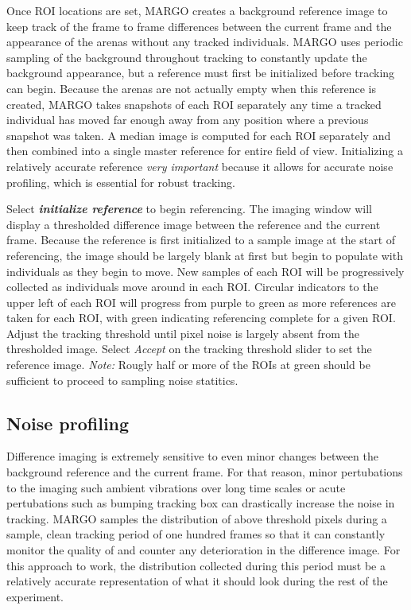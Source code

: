 \documentclass[11pt]{article}
\begin{document}
Once ROI locations are set, MARGO creates a background reference image to keep track of the frame to frame differences between the current frame and the appearance of the arenas without any tracked individuals. MARGO uses periodic sampling of the background throughout tracking to constantly update the background appearance, but a reference must first be initialized before tracking can begin.  Because the arenas are not actually empty when this reference is created, MARGO takes snapshots of each ROI separately any time a tracked individual has moved far enough away from any position where a previous snapshot was taken. A median image is computed for each ROI separately and then combined into a single master reference for entire field of view. Initializing a relatively accurate reference \textit{very important} because it allows for accurate noise profiling, which is essential for robust tracking.

Select \textbf{\textit{initialize reference}} to begin referencing. The imaging window will display a thresholded difference image between the reference and the current frame. Because the reference is first initialized to a sample image at the start of referencing, the image should be largely blank at first but begin to populate with individuals as they begin to move. New samples of each ROI will be progressively collected as individuals move around in each ROI. Circular indicators to the upper left of each ROI will progress from purple to green as more references are taken for each ROI, with green indicating referencing complete for a given ROI. Adjust the tracking threshold until pixel noise is largely absent from the thresholded image. Select \textit{Accept} on the tracking threshold slider to set the reference image. \textit{Note:} Rougly half or more of the ROIs at green should be sufficient to proceed to sampling noise statitics.

\subsection{Noise profiling}

Difference imaging is extremely sensitive to even minor changes between the background reference and the current frame. For that reason, minor pertubations to the imaging such ambient vibrations over long time scales or acute pertubations such as bumping tracking box can drastically increase the noise in tracking. MARGO samples the distribution of above threshold pixels during a sample, clean tracking period of one hundred frames so that it can constantly monitor the quality of and counter any deterioration in the difference image. For this approach to work, the distribution collected during this period must be a relatively accurate representation of what it should look during the rest of the experiment.
\end{document}
